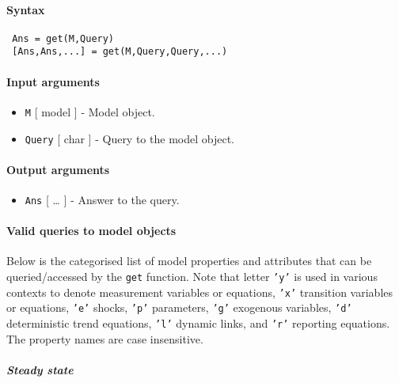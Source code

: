 


	\paragraph{Syntax}
 
 \begin{verbatim}
 Ans = get(M,Query)
 [Ans,Ans,...] = get(M,Query,Query,...)
 \end{verbatim}
 
 \paragraph{Input arguments}
 
 \begin{itemize}
 \item
   \texttt{M} {[} model {]} - Model object.
 \item
   \texttt{Query} {[} char {]} - Query to the model object.
 \end{itemize}
 
 \paragraph{Output arguments}
 
 \begin{itemize}
 \item
   \texttt{Ans} {[} \ldots{} {]} - Answer to the query.
 \end{itemize}
 
 \paragraph{Valid queries to model objects}
 
 Below is the categorised list of model properties and attributes that
 can be queried/accessed by the \texttt{get} function. Note that letter
 \texttt{'y'} is used in various contexts to denote measurement variables
 or equations, \texttt{'x'} transition variables or equations,
 \texttt{'e'} shocks, \texttt{'p'} parameters, \texttt{'g'} exogenous
 variables, \texttt{'d'} deterministic trend equations, \texttt{'l'}
 dynamic links, and \texttt{'r'} reporting equations. The property names
 are case insensitive.
 
 \subparagraph{Steady state}
 
